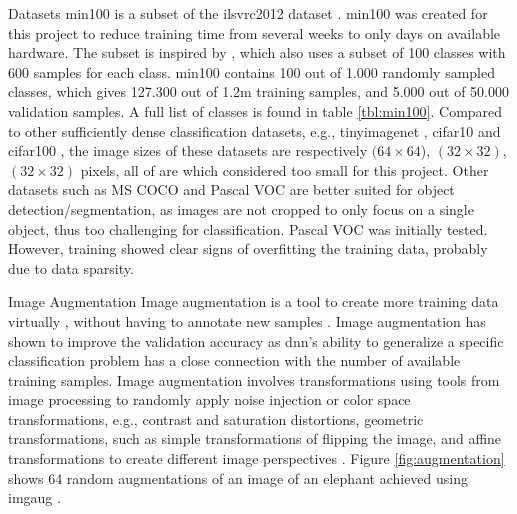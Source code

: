 \begin{enumdescript}
\begin{enumdescript}
		\item[Datasets] \gls{min100} is a subset of the \gls{ilsvrc2012} dataset \cite{russakovsky_imagenet_2015}. \gls{min100} was created for this project to reduce training time from several weeks to only days on available hardware. The subset is inspired by \cite{vinyals_matching_2016}, which also uses a subset of 100 classes with 600 samples for each class. \gls{min100} contains 100 out of 1.000 randomly sampled classes, which gives 127.300 out of 1.2m training samples, and 5.000 out of 50.000 validation samples. A full list of classes is found in table \ref{tbl:min100}. 
		Compared to other sufficiently dense classification datasets, e.g., \gls{tinyimagenet} \cite{li_cs231n:_2018}, \gls{cifar10} and \gls{cifar100} \cite{krizhevsky_cifar-10_nodate}, the image sizes of these datasets are respectively $(64\times 64$), $(32\times 32)$, $(32\times 32)$ pixels, all of are which considered too small for this project. Other datasets such as MS COCO and Pascal VOC are better suited for object detection/segmentation, as images are not cropped to only focus on a single object, thus too challenging for classification. Pascal VOC was initially tested. However, training showed clear signs of overfitting the training data, probably due to data sparsity. 
		
		\item[Image Augmentation] Image augmentation is a tool to create more training data virtually \cite{perez_effectiveness_2017}, without having to annotate new samples \cite{goodfellow_deep_2016}. Image augmentation has shown to improve the validation accuracy as \gls{dnn}'s ability to generalize a specific classification problem has a close connection with the number of available training samples.
		Image augmentation involves transformations using tools from image processing to randomly apply noise injection or color space transformations, e.g., contrast and saturation distortions, geometric transformations, such as simple transformations of flipping the image, and affine transformations to create different image perspectives \cite{shorten_survey_2019}. Figure \ref{fig:augmentation} shows 64 random augmentations of an image of an elephant achieved using \gls{imgaug} \cite{jung_imgaug:_nodate}.  
		

\end{enumdescript}
\end{enumdescript}

